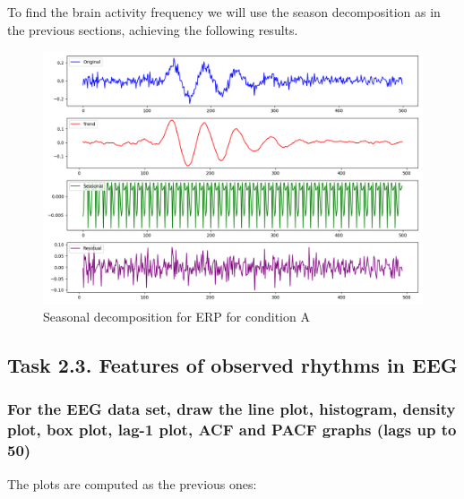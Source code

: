 \documentclass{article}
\begin{document}
 To find the brain activity frequency we will use the season decomposition as in the previous sections, achieving the following results.
 \begin{figure}[H]
    \centering \includegraphics[width=0.6\linewidth]{img/ecg1/Erpa_seasonaldecomposition.png}
    \caption{Seasonal decomposition for ERP for condition A}
    \label{fig:erpA_decomposed}
    \end{figure}  
 
\subsection{Task 2.3. Features of observed rhythms in EEG}

\subsubsection{For the EEG data set, draw the line plot, histogram, density plot, box plot, lag-1
 plot, ACF and PACF graphs (lags up to 50)}
 The plots are computed as the previous ones:
 
\end{document}
